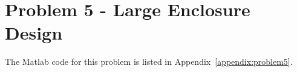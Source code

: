{{{%
%










\newpage
\section*{Problem 5 - Large Enclosure Design}

The Matlab code for this problem is listed in Appendix~\ref{appendix:problem5}.

}}}
